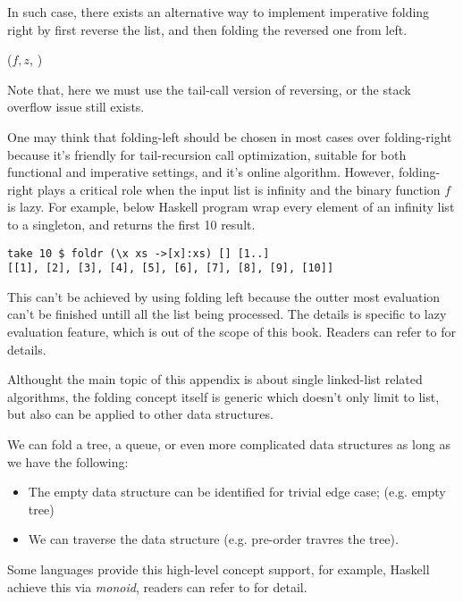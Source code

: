 \documentclass{article}
\begin{document}
In such case, there exists an alternative way to implement imperative folding right by first reverse the list, and then
folding the reversed one from left.

\begin{algorithmic}
  \State \Return {}($f, z$, )
\EndFunction
\end{algorithmic}

Note that, here we must use the tail-call version of reversing, or the stack overflow issue still exists.

One may think that folding-left should be chosen in most cases over folding-right because it's friendly for 
tail-recursion call optimization, suitable for both functional and imperative settings, and it's online
algorithm. However, folding-right plays a critical role when the input list is infinity and the binary function
$f$ is lazy. For example, below Haskell program wrap every element of an infinity list to a singleton, and
returns the first 10 result.

\lstset{language=Haskell}
\begin{lstlisting}
take 10 $ foldr (\x xs ->[x]:xs) [] [1..]
[[1], [2], [3], [4], [5], [6], [7], [8], [9], [10]]
\end{lstlisting} %

This can't be achieved by using folding left because the outter most evaluation can't be finished untill
all the list being processed. The details is specific to lazy evaluation feature, which is out of the 
scope of this book. Readers can refer to \cite{Haskell-wiki} for details.

Althought the main topic of this appendix is about single linked-list related algorithms, the folding
concept itself is generic which doesn't only limit to list, but also can be applied to other data structures.

We can fold a tree, a queue, or even more complicated data structures as long as we have the following:

\begin{itemize}
\item The empty data structure can be identified for trivial edge case; (e.g. empty tree)
\item We can traverse the data structure (e.g. pre-order travres the tree).
\end{itemize}

Some languages provide this high-level concept support, for example, Haskell achieve this via
{\em monoid}, readers can refer to \cite{learn-haskell} for detail.
\end{document}
